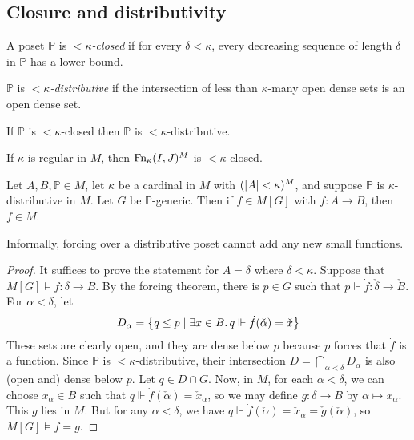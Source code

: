 \subsection{Closure and distributivity}
\begin{definition}
    A poset \( \mathbb P \) is \emph{\( <\kappa \)-closed} if for every \( \delta < \kappa \), every decreasing sequence of length \( \delta \) in \( \mathbb P \) has a lower bound.
\end{definition}
\begin{definition}
    \( \mathbb P \) is \emph{\( <\kappa \)-distributive} if the intersection of less than \( \kappa \)-many open dense sets is an open dense set.
\end{definition}
\begin{lemma}
    If \( \mathbb P \) is \( <\kappa \)-closed then \( \mathbb P \) is \( <\kappa \)-distributive.
\end{lemma}
\begin{lemma}
    If \( \kappa \) is regular in \( M \), then \( \operatorname{Fn}_\kappa(I, J)^M \) is \( <\kappa \)-closed.
\end{lemma}
\begin{theorem}
    Let \( A, B, \mathbb P \in M \), let \( \kappa \) be a cardinal in \( M \) with \( (\abs{A} < \kappa)^M \), and suppose \( \mathbb P \) is \( \kappa \)-distributive in \( M \).
    Let \( G \) be \( \mathbb P \)-generic.
    Then if \( f \in M[G] \) with \( f : A \to B \), then \( f \in M \).
\end{theorem}
Informally, forcing over a distributive poset cannot add any new small functions.
\begin{proof}
    It suffices to prove the statement for \( A = \delta \) where \( \delta < \kappa \).
    Suppose that \( M[G] \vDash f : \delta \to B \).
    By the forcing theorem, there is \( p \in G \) such that \( p \Vdash \dot f : \check \delta \to \check B \).
    For \( \alpha < \delta \), let
    \[ D_\alpha = \qty{q \leq p \mid \exists x \in B .\, q \Vdash \dot f(\check \alpha) = \check x} \]
    These sets are clearly open, and they are dense below \( p \) because \( p \) forces that \( \dot f \) is a function.
    Since \( \mathbb P \) is \( <\kappa \)-distributive, their intersection \( D = \bigcap_{\alpha < \delta} D_\alpha \) is also (open and) dense below \( p \).
    Let \( q \in D \cap G \).
    Now, in \( M \), for each \( \alpha < \delta \), we can choose \( x_\alpha \in B \) such that \( q \Vdash \dot f(\check \alpha) = \check x_\alpha \), so we may define \( g : \delta \to B \) by \( \alpha \mapsto x_\alpha \).
    This \( g \) lies in \( M \).
    But for any \( \alpha < \delta \), we have \( q \Vdash \dot f(\check \alpha) = \check x_\alpha = \check g(\check \alpha) \), so \( M[G] \vDash f = g \).
\end{proof}
